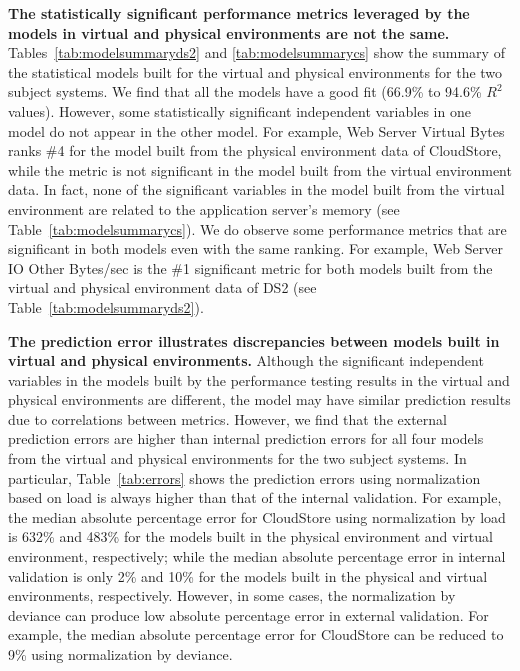 \documentclass[smallextended]{svjour3}       %
\begin{document}
\noindent \textbf{The statistically significant performance metrics leveraged by the models in virtual and physical environments are not the same.} Tables~\ref{tab:modelsummaryds2} and \ref{tab:modelsummarycs} show the summary of the statistical models built for the virtual and physical environments for the two subject systems. We find that all the models have a good fit (66.9\% to 94.6\% $R^2$ values). However, some statistically significant independent variables in one model do not appear in the other model. For example, Web Server Virtual Bytes ranks \#4 for the model built from the physical environment data of CloudStore, while the metric is not significant in the model built from the virtual environment data. In fact, none of the significant variables in the model built from the virtual environment are related to the application server's memory (see Table~\ref{tab:modelsummarycs}). We do observe some performance metrics that are significant in both models even with the same ranking. For example, Web Server IO Other Bytes/sec is the \#1 significant metric for both models built from the virtual and physical environment data of DS2 (see Table~\ref{tab:modelsummaryds2}). 

\noindent \textbf{The prediction error illustrates discrepancies between models built in virtual and physical environments.} Although the significant independent variables in the models built by the performance testing results in the virtual and physical environments are different, the model may have similar prediction results due to correlations between metrics. However, we find that the external prediction errors are higher than internal prediction errors for all four models from the virtual and physical environments for the two subject systems. In particular, Table~\ref{tab:errors} shows the prediction errors using normalization based on load is always higher than that of the internal validation. For example, the median absolute percentage error for CloudStore using normalization by load is 632\% and 483\% for the models built in the physical environment and virtual environment, respectively; while the median absolute percentage error in internal validation is only 2\% and 10\% for the models built in the physical and virtual environments, respectively. However, in some cases, the normalization by deviance can produce low absolute percentage error in external validation. For example, the median absolute percentage error for CloudStore can be reduced to 9\% using normalization by deviance. 
\end{document}
